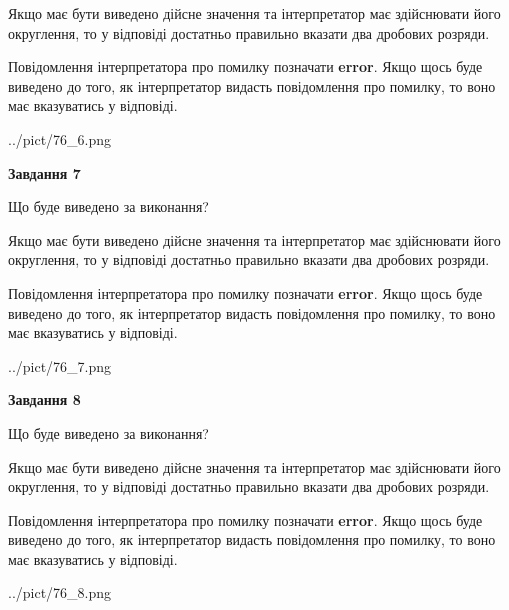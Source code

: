 \documentclass[12pt, ukrainian]{article}
\begin{document}
{\begin {Large}
Якщо має бути виведено дійсне значення та інтерпретатор має здійснювати його округлення, 
то у відповіді достатньо правильно вказати два дробових розряди.

Повідомлення інтерпретатора про помилку позначати \textbf{error}.
Якщо щось буде виведено до того, як інтерпретатор видасть повідомлення про помилку, 
то воно має вказуватись у відповіді. \par

\begin{center}
	{../pict/76_6.png}
\end{center}
\newpage

{\begin {center}\textbf{Завдання 7}\end {center}}\par
Що буде виведено за виконання? \par

Якщо має бути виведено дійсне значення та інтерпретатор має здійснювати його округлення, 
то у відповіді достатньо правильно вказати два дробових розряди.

Повідомлення інтерпретатора про помилку позначати \textbf{error}.
Якщо щось буде виведено до того, як інтерпретатор видасть повідомлення про помилку, 
то воно має вказуватись у відповіді. \par

\begin{center}
	{../pict/76_7.png}
\end{center}
\newpage

{\begin {center}\textbf{Завдання 8}\end {center}}\par
Що буде виведено за виконання? \par

Якщо має бути виведено дійсне значення та інтерпретатор має здійснювати його округлення, 
то у відповіді достатньо правильно вказати два дробових розряди.

Повідомлення інтерпретатора про помилку позначати \textbf{error}.
Якщо щось буде виведено до того, як інтерпретатор видасть повідомлення про помилку, 
то воно має вказуватись у відповіді. \par

\begin{center}
	{../pict/76_8.png}
\end{center}
\newpage


\end{Large}}
\end{document}
